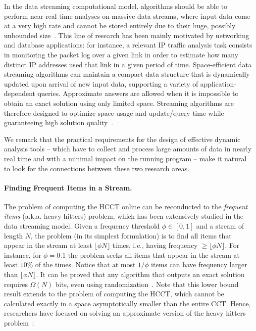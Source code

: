In the data streaming computational model, algorithms should be able to perform near-real time analyses on massive data streams, where input data come at a very high rate and cannot be stored entirely due to their huge, possibly unbounded size~\cite{Demetrescu07,Muthukrishnan05}. This line of research has been mainly motivated by networking and database applications: for instance, a relevant IP traffic analysis task consists in monitoring the packet log over a given link in order to estimate how many distinct IP addresses used that link in a given period of time. Space-efficient data streaming algorithms can maintain a compact data structure that is dynamically updated upon arrival of new input data, supporting a variety of application-dependent queries. Approximate answers are allowed when it is impossible to obtain an exact solution using only limited space. Streaming algorithms are therefore designed to optimize space usage and update/query time while guaranteeing high solution quality~\cite{Muthukrishnan05}.

We remark that the practical requirements for the design of effective dynamic analysis tools -- which have to collect and process large amounts of data in nearly real time and with a minimal impact on the running program -- make it natural to look for the connections between these two research areas.

\paragraph*{Finding Frequent Items in a Stream.} The problem of computing the HCCT online can be reconducted to the {\em frequent items} (a.k.a. heavy hitters) problem, which has been extensively studied in the data streaming model. Given a frequency threshold $\phi\in[0,1]$ and a stream of length $N$, the problem (in its simplest formulation) is to find all items that appear in the stream at least $\lfloor\phi N\rfloor$ times, i.e., having frequency $\ge\lfloor\phi N\rfloor$. For instance, for $\phi=0.1$ the problem seeks all items that appear in the stream at least $10\%$ of the times. Notice that at most $1/\phi$ items can have frequency larger than $\lfloor\phi N\rfloor$.  It can be proved that any algorithm that outputs an exact solution requires $\Omega(N)$ bits, even using randomization~\cite{Muthukrishnan05}. Note that this lower bound result extends to the problem of computing the HCCT, which cannot be calculated exactly in a space asymptotically smaller than the entire CCT. Hence, researchers have focused on solving an approximate version of the heavy hitters problem~\cite{Muthukrishnan05}:

